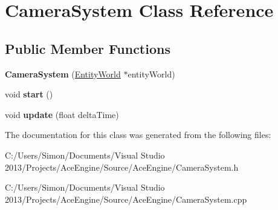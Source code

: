 \hypertarget{class_camera_system}{}\section{Camera\+System Class Reference}
\label{class_camera_system}
\subsection*{Public Member Functions}
\begin{DoxyCompactItemize}
\item 
\hypertarget{class_camera_system_aa014df0181c358c23db31610643efb07}{}{\bfseries Camera\+System} (\hyperlink{class_entity_world}{Entity\+World} $\ast$entity\+World)\label{class_camera_system_aa014df0181c358c23db31610643efb07}

\item 
\hypertarget{class_camera_system_a39564045e7ef0ef7171f82e55586e4c9}{}void {\bfseries start} ()\label{class_camera_system_a39564045e7ef0ef7171f82e55586e4c9}

\item 
\hypertarget{class_camera_system_a09f1bfd9b78bba8e7f30c36ad8a65cdd}{}void {\bfseries update} (float delta\+Time)\label{class_camera_system_a09f1bfd9b78bba8e7f30c36ad8a65cdd}

\end{DoxyCompactItemize}


The documentation for this class was generated from the following files\+:\begin{DoxyCompactItemize}
\item 
C\+:/\+Users/\+Simon/\+Documents/\+Visual Studio 2013/\+Projects/\+Ace\+Engine/\+Source/\+Ace\+Engine/Camera\+System.\+h\item 
C\+:/\+Users/\+Simon/\+Documents/\+Visual Studio 2013/\+Projects/\+Ace\+Engine/\+Source/\+Ace\+Engine/Camera\+System.\+cpp\end{DoxyCompactItemize}
